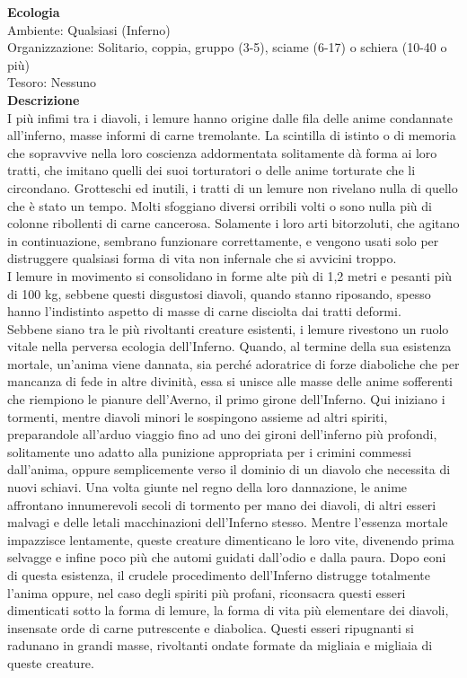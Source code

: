 \begin{multicols}{2}
\textbf{Ecologia}\\
Ambiente: Qualsiasi (Inferno)\\
Organizzazione: Solitario, coppia, gruppo (3-5), sciame (6-17) o schiera (10-40 o più)\\
Tesoro: Nessuno\\
\textbf{Descrizione}\\
I più infimi tra i diavoli, i lemure hanno origine dalle fila delle anime condannate all’inferno, masse informi di carne tremolante. La scintilla di istinto o di memoria che sopravvive nella loro coscienza addormentata solitamente dà forma ai loro tratti, che imitano quelli dei suoi torturatori o delle anime torturate che li circondano. Grotteschi ed inutili, i tratti di un lemure non rivelano nulla di quello che è stato un tempo. Molti sfoggiano diversi orribili volti o sono nulla più di colonne ribollenti di carne cancerosa. Solamente i loro arti bitorzoluti, che agitano in continuazione, sembrano funzionare correttamente, e vengono usati solo per distruggere qualsiasi forma di vita non infernale che si avvicini troppo.\\
I lemure in movimento si consolidano in forme alte più di 1,2 metri e pesanti più di 100 kg, sebbene questi disgustosi diavoli, quando stanno riposando, spesso hanno l’indistinto aspetto di masse di carne disciolta dai tratti deformi.\\

Sebbene siano tra le più rivoltanti creature esistenti, i lemure rivestono un ruolo vitale nella perversa ecologia dell’Inferno. Quando, al termine della sua esistenza mortale, un’anima viene dannata, sia perché adoratrice di forze diaboliche che per mancanza di fede in altre divinità, essa si unisce alle masse delle anime sofferenti che riempiono le pianure dell’Averno, il primo girone dell’Inferno. Qui iniziano i tormenti, mentre diavoli minori le sospingono assieme ad altri spiriti, preparandole all'arduo viaggio fino ad uno dei gironi dell’inferno più profondi, solitamente uno adatto alla punizione appropriata per i crimini commessi dall'anima, oppure semplicemente verso il dominio di un diavolo che necessita di nuovi schiavi. Una volta giunte nel regno della loro dannazione, le anime affrontano innumerevoli secoli di tormento per mano dei diavoli, di altri esseri malvagi e delle letali macchinazioni dell’Inferno stesso. Mentre l’essenza mortale impazzisce lentamente, queste creature dimenticano le loro vite, divenendo prima selvagge e infine poco più che automi guidati dall'odio e dalla paura. Dopo eoni di questa esistenza, il crudele procedimento dell’Inferno distrugge totalmente l’anima oppure, nel caso degli spiriti più profani, riconsacra questi esseri dimenticati sotto la forma di lemure, la forma di vita più elementare dei diavoli, insensate orde di carne putrescente e diabolica. Questi esseri ripugnanti si radunano in grandi masse, rivoltanti ondate formate da migliaia e migliaia di queste creature.\\


\end{multicols}
